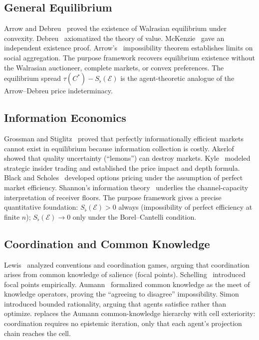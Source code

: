 \documentclass[twocolumn,11pt,a4paper]{article}
\theoremstyle{remark}
\newcommand{\Sflat}{S_{\flat}}
\newcommand{\tol}{\tau}
\newcommand{\Ens}{\mathcal{E}}            %
\begin{document}
\subsection{General Equilibrium}
\label{sec:lit:ge}

Arrow and Debreu~\cite{arrowdebreu1954} proved the existence of Walrasian
equilibrium under convexity.  Debreu~\cite{debreu1959} axiomatized the
theory of value.  McKenzie~\cite{mckenzie1954} gave an independent existence
proof.  Arrow's~\cite{arrow1951} impossibility theorem establishes limits
on social aggregation.  The purpose framework recovers equilibrium existence
without the Walrasian auctioneer, complete markets, or convex preferences.
The equilibrium spread $\tol(C^*) - \Sflat(\Ens)$ is the agent-theoretic
analogue of the Arrow--Debreu price indeterminacy.

\subsection{Information Economics}
\label{sec:lit:info}

Grossman and Stiglitz~\cite{grossmanstiglitz1980} proved that perfectly
informationally efficient markets cannot exist in equilibrium because
information collection is costly.  Akerlof~\cite{akerlof1970} showed
that quality uncertainty (``lemons'') can destroy markets.
Kyle~\cite{kyle1985} modeled strategic insider trading and established the
price impact and depth formula.  Black and Scholes~\cite{blackscholes1973}
developed options pricing under the assumption of perfect market efficiency.
Shannon's information theory~\cite{shannon1948} underlies the channel-capacity
interpretation of receiver floors.
The purpose framework gives a precise quantitative foundation:
$\Sflat(\Ens) > 0$ always (impossibility of perfect efficiency at finite
$n$); $\Sflat(\Ens) \to 0$ only under the Borel--Cantelli condition.

\subsection{Coordination and Common Knowledge}
\label{sec:lit:ck}

Lewis~\cite{lewis1969} analyzed conventions and coordination games, arguing
that coordination arises from common knowledge of salience (focal points).
Schelling~\cite{schelling1960} introduced focal points empirically.
Aumann~\cite{aumann1976} formalized common knowledge as the meet of
knowledge operators, proving the ``agreeing to disagree'' impossibility.
Simon~\cite{simon1955} introduced bounded rationality, arguing that agents
satisfice rather than optimize.
 replaces the Aumann common-knowledge hierarchy with cell
exteriority: coordination requires no epistemic iteration, only that each
agent's projection chain reaches the cell.
\end{document}

